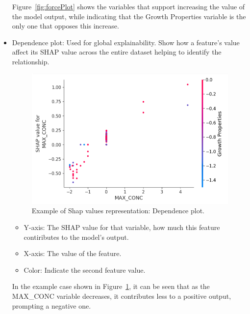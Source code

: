 \begin{itemize}
    Figure~\ref{fig:forcePlot} shows the variables that support increasing the value of the model output, while indicating that the Growth Properties variable is the only one that opposes this increase.

    \item Dependence plot: Used for global explainability. Show how a feature's value affect its SHAP value across the entire dataset helping to identify the relationship.
    \begin{figure}[H]
        \centering
        \includegraphics[width=1\textwidth]{figures/shap/depence_plot.png}
        \caption{Example of Shap values representation: Dependence plot.}
        \label{fig:dependecePlot}
    \end{figure}

    \begin{itemize}
        \item Y-axis: The SHAP value for that variable, how much this feature contiributes to the model's output.
        \item X-axis: The value of the feature.
        \item Color: Indicate the second feature value.
    \end{itemize}

    In the example case shown in Figure~\ref{fig:dependecePlot}, it can be seen that as the MAX\_CONC variable decreases, it contributes less to a positive output, prompting a negative one.
\end{itemize}

